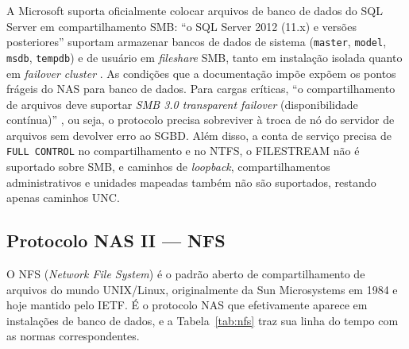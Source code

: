 \documentclass[11pt,a4paper]{article}
\begin{document}
A Microsoft suporta oficialmente colocar arquivos de banco de dados do SQL Server em compartilhamento
SMB: ``o SQL Server 2012 (11.x) e versões posteriores'' suportam armazenar bancos de dados de sistema
(\texttt{master}, \texttt{model}, \texttt{msdb}, \texttt{tempdb}) e de usuário em \textit{fileshare}
SMB, tanto em instalação isolada quanto em \textit{failover cluster} \cite{mssqlsmb}. As condições
que a documentação impõe expõem os pontos frágeis do NAS para banco de dados. Para cargas críticas,
``o compartilhamento de arquivos deve suportar \textit{SMB 3.0 transparent failover} (disponibilidade
contínua)'' \cite{mssqlsmb}, ou seja, o protocolo precisa sobreviver à troca de nó do servidor de
arquivos sem devolver erro ao SGBD. Além disso, a conta de serviço precisa de \texttt{FULL CONTROL}
no compartilhamento e no NTFS, o FILESTREAM não é suportado sobre SMB, e caminhos de
\textit{loopback}, compartilhamentos administrativos e unidades mapeadas também não são suportados,
restando apenas caminhos UNC.

\subsection{Protocolo NAS II --- NFS}
\label{sec:nfs}

O NFS (\textit{Network File System}) é o padrão aberto de compartilhamento de arquivos do mundo
UNIX/Linux, originalmente da Sun Microsystems em 1984 e hoje mantido pelo IETF. É o protocolo NAS que
efetivamente aparece em instalações de banco de dados, e a Tabela~\ref{tab:nfs} traz sua linha do
tempo com as normas correspondentes.
\end{document}
